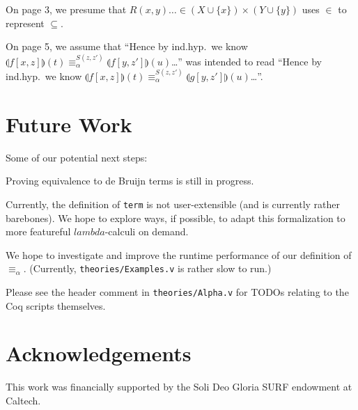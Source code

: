\documentclass{article}
\begin{document}
On page 3, we presume that $R(x,y) \dots \in (X \cup \{ x \}) \times (Y \cup \{ y \})$ uses $\in$ to
represent $\subseteq$.

On page 5, we assume that ``Hence by ind.hyp.\ we know $\llparenthesis f[x,z] \rrparenthesis (t)
\equiv_\alpha^{S(z,z')} \llparenthesis f[y,z'] \rrparenthesis (u)$\dots'' was intended to read
``Hence by ind.hyp.\ we know $\llparenthesis f[x,z] \rrparenthesis (t) \equiv_\alpha^{S(z,z')}
\llparenthesis g[y,z'] \rrparenthesis (u)$\dots''.

\section{Future Work}

Some of our potential next steps:

Proving equivalence to de Bruijn terms is still in progress.

Currently, the definition of \verb|term| is not user-extensible (and is currently rather barebones).
We hope to explore ways, if possible, to adapt this formalization to more featureful
$lambda$-calculi on demand.

We hope to investigate and improve the runtime performance of our definition of $\equiv_\alpha$.
(Currently, \verb|theories/Examples.v| is rather slow to run.)

Please see the header comment in \verb|theories/Alpha.v| for TODOs relating to the Coq scripts
themselves.

\section{Acknowledgements}

This work was financially supported by the Soli Deo Gloria SURF endowment at Caltech.
\end{document}
